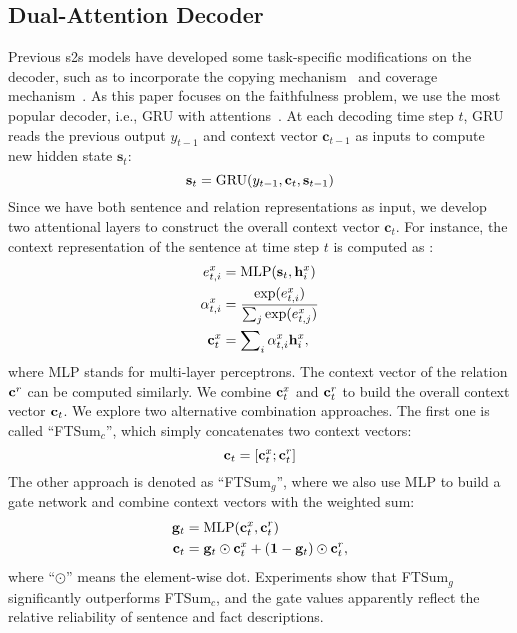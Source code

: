 \documentclass[letterpaper]{article} \usepackage{aaai18}  \usepackage{times}  \usepackage{helvet}  \usepackage{courier}  \usepackage{url}  \usepackage{graphicx}  \usepackage{amsfonts}
\begin{document}
	\subsection{Dual-Attention Decoder}
	Previous s2s models have developed some task-specific modifications on the decoder, such as to incorporate  the copying mechanism~\cite{gu2016incorporating} and coverage mechanism~\cite{see2017get}.
	As this paper focuses on the faithfulness problem, we use the most popular decoder, i.e., GRU with attentions~\cite{bahdanau2014neural}.
	At each decoding time step $t$, GRU reads the previous output $y_{t - 1}$ and context vector ${{\mathbf{c}}_{t - 1}}$ as inputs to compute new hidden state $\mathbf{s}_t$:
	\begin{equation}
		{{\bf{s}}_t} = {\rm{GRU}}({y_{t - 1}},{{\bf{c}}_t},{{\bf{s}}_{t - 1}})
	\end{equation}
	Since we have both sentence and relation representations as input, we develop two attentional layers to construct the overall context vector ${{\mathbf{c}}_{t}}$. 
For instance, the context representation of the sentence at time step $t$ is computed as \cite{luong2015effective}:
	\begin{align}
		{e_{t,i}^x} &= \text{MLP}({{\bf{s}}_{t}},{{\bf{h}}_i^x})\\
		{\alpha _{t,i}^x} &= \frac{{\exp ({e_{t,i}^x})}}{{\sum\nolimits_j {\exp ({e_{t,j}^x})} }} \\
		{{\bf{c}}_t^x} &= \sum\nolimits_i {{\alpha _{t,i}^x}{{\bf{h}}_i^x}}, 
	\end{align}
	where MLP stands for multi-layer perceptrons.
	The context vector of the relation ${\bf{c}}^r$ can be computed similarly.
	We combine ${\bf{c}}_t^x$ and ${\bf{c}}_t^r$ to build the overall context vector ${\bf{c}}_t$.
	We explore two alternative combination approaches.
	The first one is called ``FTSum$_c$'', which simply concatenates two context vectors: 
	\begin{equation}\label{eq:context_concate}
		{{\bf{c}}_t} = [{\bf{c}}_t^x;{\bf{c}}_t^r]
	\end{equation}
	The other approach is denoted as ``FTSum$_g$'', where we also use MLP to build a gate network and combine context vectors with the weighted sum:
	\begin{align}
		{{\bf{g}}_t} &= {\rm{MLP}}({\bf{c}}_t^x,{\bf{c}}_t^r) \label{eq:context_gate}\\
		{{\bf{c}}_t} &= {{\bf{g}}_t} \odot {\bf{c}}_t^x + ({\bf{1}} - {{\bf{g}}_t}) \odot {\bf{c}}_t^r,
	\end{align}
	where ``$\odot$'' means the element-wise dot.
	Experiments show that FTSum$_g$ significantly outperforms FTSum$_c$, and the gate values apparently reflect the relative reliability of sentence and fact descriptions. 
	
\end{document}
